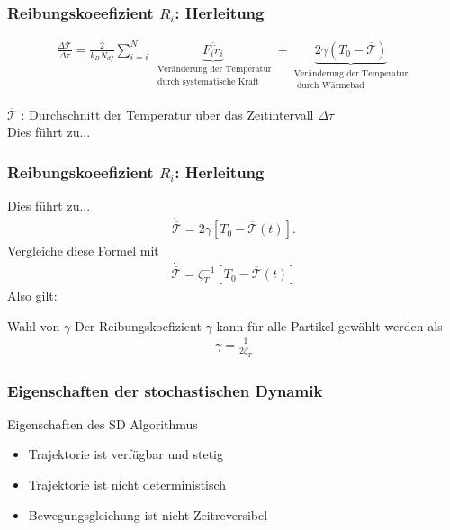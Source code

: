 \documentclass{beamer}
\begin{document}
\begin{frame}
	\frametitle{Reibungskoeefizient $R_i$: Herleitung}
	\begin{align*}
		\frac{\Delta \mathcal{T}}{\Delta \tau} = \frac{2}{k_B N_{df}} \sum\limits_{i=i}^N  \underbrace{\overline{F_i \dot{r}_i} }_ {\substack{\text{ Veränderung der Temperatur} \\ \text{ durch systematische Kraft}} }+\underbrace{ 2 \gamma (T_0 - \overline{\mathcal{T}})  }_{\substack{\text{Veränderung der Temperatur} \\ \text{ durch Wärmebad}}}
	\end{align*} 	
	
	$\overline{\mathcal{T}}$ : Durchschnitt der Temperatur über das Zeitintervall $\Delta \tau$\\
	Dies führt zu...
\end{frame}

\begin{frame} 
	\frametitle{Reibungskoeefizient $R_i$: Herleitung} 
	
	Dies führt zu...
	\begin{align*}
		\dot{ \overline{\mathcal{T}} } = 2 \gamma [T_0 - \overline{\mathcal{T}}(t)]  .
	\end{align*}
	Vergleiche diese Formel mit 
	\begin{align*}
	\dot{ \overline{\mathcal{T}} } = \zeta_T^{-1} [T_0 - \overline{\mathcal{T}}(t)] 
	\end{align*}
	Also gilt:
	\begin{block}{Wahl von $\gamma$}
		Der Reibungskoefizient $\gamma$ kann für alle Partikel gewählt werden als 
		\begin{align*}
			\gamma = \frac{1}{2 \zeta_T}
		\end{align*}
	\end{block}
\end{frame}


\begin{frame} 
	\frametitle{Eigenschaften der stochastischen Dynamik} 
	\begin{block}{Eigenschaften des SD Algorithmus}
		\begin{itemize}
			\item Trajektorie ist verfügbar und stetig
			\item  Trajektorie ist nicht deterministisch
			\item Bewegungsgleichung ist nicht Zeitreversibel
		\end{itemize}
	\end{block}
\end{frame}
	
\end{document}
